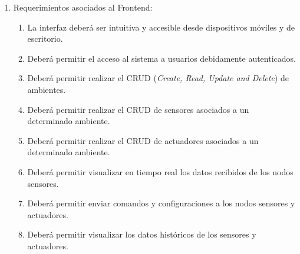 \begin{enumerate}
	\item Requerimientos asociados al Frontend:
	      \begin{enumerate}
		      \item La interfaz deberá ser intuitiva y accesible desde dispositivos móviles y de escritorio.
		      \item Deberá permitir el acceso al sistema a usuarios debidamente autenticados.
		      \item Deberá permitir realizar el CRUD (\textit{Create, Read, Update and Delete}) de ambientes.
		      \item Deberá permitir realizar el CRUD de sensores asociados a un determinado ambiente.
		      \item Deberá permitir realizar el CRUD de actuadores asociados a un determinado ambiente.
		      \item Deberá permitir visualizar en tiempo real los datos recibidos de los nodos sensores.
		      \item Deberá permitir enviar comandos y configuraciones a los nodos sensores y actuadores.
		      \item Deberá permitir visualizar los datos históricos de los sensores y actuadores.
	      \end{enumerate}


\end{enumerate}
